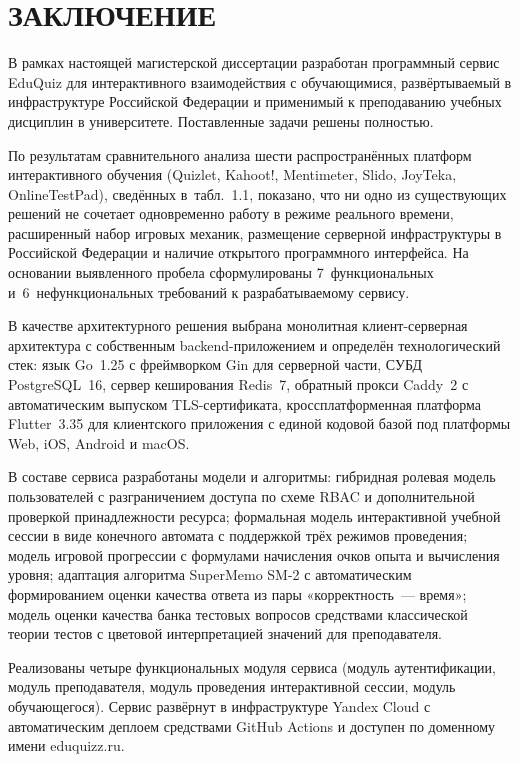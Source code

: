 \section*{ЗАКЛЮЧЕНИЕ}
\thispagestyle{plain}

В рамках настоящей магистерской диссертации разработан программный
сервис EduQuiz для интерактивного взаимодействия с обучающимися,
развёртываемый в инфраструктуре Российской Федерации и применимый
к преподаванию учебных дисциплин в университете. Поставленные задачи
решены полностью.

По результатам сравнительного анализа шести распространённых
платформ интерактивного обучения (Quizlet, Kahoot!, Mentimeter,
Slido, JoyTeka, OnlineTestPad), сведённых в~табл.~1.1, показано,
что ни одно из существующих решений не сочетает одновременно
работу в режиме реального времени, расширенный набор игровых
механик, размещение серверной инфраструктуры в Российской
Федерации и наличие открытого программного интерфейса. На
основании выявленного пробела сформулированы 7~функциональных
и~6~нефункциональных требований к разрабатываемому сервису.

В качестве архитектурного решения выбрана монолитная
клиент-серверная архитектура с собственным backend-приложением
и определён технологический стек: язык Go~1.25 с фреймворком
Gin для серверной части, СУБД PostgreSQL~16, сервер кеширования
Redis~7, обратный прокси Caddy~2 с автоматическим выпуском
TLS-сертификата, кроссплатформенная платформа Flutter~3.35
для клиентского приложения с единой кодовой базой под платформы
Web, iOS, Android и macOS.

В составе сервиса разработаны модели и алгоритмы: гибридная
ролевая модель пользователей с разграничением доступа по схеме
RBAC и дополнительной проверкой принадлежности ресурса; формальная
модель интерактивной учебной сессии в виде конечного автомата
с поддержкой трёх режимов проведения; модель игровой прогрессии
с формулами начисления очков опыта и вычисления уровня;
адаптация алгоритма SuperMemo SM-2 с автоматическим формированием
оценки качества ответа из пары «корректность~--- время»; модель
оценки качества банка тестовых вопросов средствами классической
теории тестов с цветовой интерпретацией значений для преподавателя.

Реализованы четыре функциональных модуля сервиса (модуль
аутентификации, модуль преподавателя, модуль проведения
интерактивной сессии, модуль обучающегося). Сервис развёрнут
в инфраструктуре Yandex Cloud с автоматическим деплоем средствами
GitHub Actions и доступен по доменному имени eduquizz.ru.

